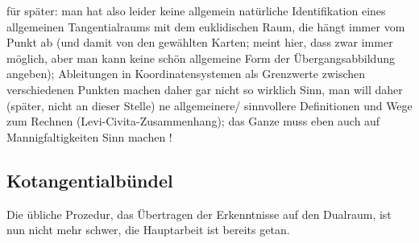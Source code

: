 \documentclass[../H_Analysis_main.tex]{subfiles}
\begin{document}





für später: man hat also leider keine allgemein natürliche Identifikation eines allgemeinen Tangentialraums mit dem euklidischen Raum, die hängt immer vom Punkt ab (und damit von den gewählten Karten; meint hier, dass zwar immer möglich, aber man kann keine schön allgemeine Form der Übergangsabbildung angeben); Ableitungen in Koordinatensystemen als Grenzwerte zwischen verschiedenen Punkten machen daher gar nicht so wirklich Sinn, man will daher (später, nicht an dieser Stelle) ne allgemeinere/ sinnvollere Definitionen und Wege zum Rechnen (Levi-Civita-Zusammenhang); das Ganze muss eben auch auf Mannigfaltigkeiten Sinn machen !



		\subsection{Kotangentialbündel}
Die übliche Prozedur, das Übertragen der Erkenntnisse auf den Dualraum, ist nun nicht mehr schwer, die Hauptarbeit ist bereits getan.
\end{document}
